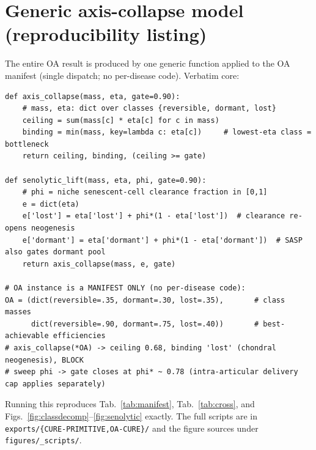 \documentclass[11pt,a4paper]{article}
\begin{document}
\section{Generic axis-collapse model (reproducibility listing)}
\label{app:code}
The entire OA result is produced by one generic function applied to the OA manifest
(single dispatch; no per-disease code). Verbatim core:

\begin{lstlisting}[basicstyle=\ttfamily\footnotesize,frame=single,xleftmargin=0pt,breaklines=true]
def axis_collapse(mass, eta, gate=0.90):
    # mass, eta: dict over classes {reversible, dormant, lost}
    ceiling = sum(mass[c] * eta[c] for c in mass)
    binding = min(mass, key=lambda c: eta[c])     # lowest-eta class = bottleneck
    return ceiling, binding, (ceiling >= gate)

def senolytic_lift(mass, eta, phi, gate=0.90):
    # phi = niche senescent-cell clearance fraction in [0,1]
    e = dict(eta)
    e['lost'] = eta['lost'] + phi*(1 - eta['lost'])  # clearance re-opens neogenesis
    e['dormant'] = eta['dormant'] + phi*(1 - eta['dormant'])  # SASP also gates dormant pool
    return axis_collapse(mass, e, gate)

# OA instance is a MANIFEST ONLY (no per-disease code):
OA = (dict(reversible=.35, dormant=.30, lost=.35),       # class masses
      dict(reversible=.90, dormant=.75, lost=.40))       # best-achievable efficiencies
# axis_collapse(*OA) -> ceiling 0.68, binding 'lost' (chondral neogenesis), BLOCK
# sweep phi -> gate closes at phi* ~ 0.78 (intra-articular delivery cap applies separately)
\end{lstlisting}

\noindent Running this reproduces Tab.~\ref{tab:manifest}, Tab.~\ref{tab:cross}, and
Figs.~\ref{fig:classdecomp}--\ref{fig:senolytic} exactly. The full scripts are in
\texttt{exports/\{CURE-PRIMITIVE,OA-CURE\}/} and the figure sources under
\texttt{figures/\_scripts/}.



\end{document}

